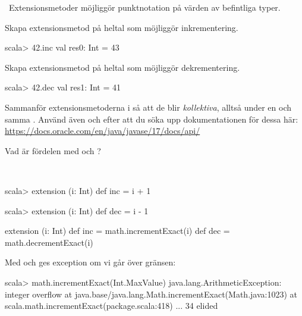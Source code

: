 \QUESTEND




\QUESTBEGIN

\Task \what~Extensionsmetoder möjliggör punktnotation på värden av befintliga typer.

\Subtask Skapa extensionsmetod på heltal som möjliggör inkrementering. 
\begin{REPLnonum}
scala> 42.inc
val res0: Int = 43
\end{REPLnonum} 

\Subtask Skapa extensionsmetod på heltal som möjliggör dekrementering.
\begin{REPLnonum}
scala> 42.dec
val res1: Int = 41
\end{REPLnonum}

\Subtask Sammanför extensionsmetoderna i så att de blir \emph{kollektiva}, alltså under en och samma . Använd även  och  efter att du söka upp dokumentationen för dessa här: \url{https://docs.oracle.com/en/java/javase/17/docs/api/}

\Subtask Vad är fördelen med   och ?



\SOLUTION

\TaskSolved \what~

\SubtaskSolved 
\begin{REPLnonum}
scala> extension (i: Int) def inc = i + 1
\end{REPLnonum}

\SubtaskSolved 
\begin{REPLnonum}
scala> extension (i: Int) def dec = i - 1
\end{REPLnonum}

\SubtaskSolved 
\begin{Code}
extension (i: Int) 
  def inc = math.incrementExact(i)
  def dec = math.decrementExact(i)
\end{Code}

\SubtaskSolved Med   och  ges exception om vi går över gränsen:
\begin{REPLnonum}
scala> math.incrementExact(Int.MaxValue)
java.lang.ArithmeticException: integer overflow
  at java.base/java.lang.Math.incrementExact(Math.java:1023)
  at scala.math.incrementExact(package.scala:418)
  ... 34 elided
\end{REPLnonum}


